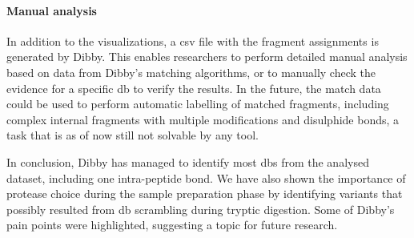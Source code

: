 \paragraph{Manual analysis} In addition to the visualizations, a csv file with the fragment assignments is generated by Dibby. This enables researchers to perform detailed manual analysis based on data from Dibby's matching algorithms, or to manually check the evidence for a specific \gls*{db} to verify the results. In the future, the match data could be used to perform automatic labelling of matched fragments, including complex internal fragments with multiple modifications and disulphide bonds, a task that is as of now still not solvable by any tool.

In conclusion, Dibby has managed to identify most \glspl*{db} from the analysed dataset, including one intra-peptide bond. We have also shown the importance of protease choice during the sample preparation phase by identifying variants that possibly resulted from \gls*{db} scrambling during tryptic digestion. Some of Dibby's pain points were highlighted, suggesting a topic for future research.
